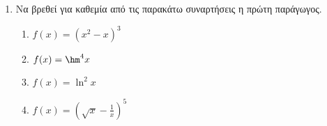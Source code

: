 \documentclass[10pt,a4paper]{article}
\begin{document}
\begin{enumerate}
\begin{multicols}{3}
\begin{enumerate}[label=\roman*.]
\item $ f(x)=x\hm{x} $
\item $ f(x)=e^x\syn{x} $
\item $ f(x)=\dfrac{x}{x-1} $
\item $ f(x)=\dfrac{x^2}{x^2-1} $
\item $ f(x)=\dfrac{\ln{x}}{x} $
\item $ f(x)=\dfrac{\hm{x}}{x^2} $
\item $ f(x)=\dfrac{e^x}{\sqrt{x}} $
\end{enumerate}
\end{multicols}
\item Να βρεθεί για καθεμία από τις παρακάτω συναρτήσεις η πρώτη παράγωγος.
\begin{multicols}{3}
\begin{enumerate}[label=\roman*.]
\item $ f(x)=(x^2-x)^3 $
\item $ f(x)=\hm^4{x} $
\item $ f(x)=\ln^2{x} $
\item $ f(x)=\left(\sqrt{x}-\frac{1}{x}\right)^5 $
\end{enumerate}
\end{multicols}
\end{enumerate}
\end{document}
